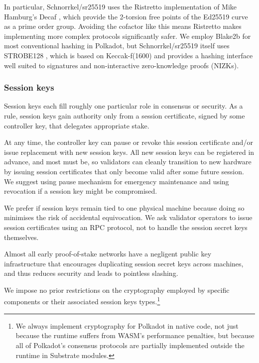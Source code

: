 \documentclass{article}
\begin{document}
In particular, Schnorrkel/sr25519 uses the Ristretto implementation \cite{Ristretto} of Mike Hamburg's Decaf \cite[\S7]{Decaf}, which provide the 2-torsion free points of the Ed25519 curve as a prime order group.  Avoiding the cofactor like this means Ristretto makes implementing more complex protocols significantly safer.  We employ Blake2b for most conventional hashing in Polkadot, but Schnorrkel/sr25519 itself uses STROBE128 \cite{STROBE}, which is based on Keccak-f(1600) and provides a hashing interface well suited to signatures and non-interactive zero-knowledge proofs (NIZKs).

\subsubsection{Session keys}\label{sec:session_keys}

Session keys each fill roughly one particular role in consensus or security.  As a rule, session keys gain authority only from a session certificate, signed by some controller key, that delegates appropriate stake.  

At any time, the controller key can pause or revoke this session certificate and/or issue replacement with new session keys.  All new session keys can be registered in advance, and most must be, so validators can cleanly transition to new hardware by issuing session certificates that only become valid after some future session.  We suggest using pause mechanism for emergency maintenance and using revocation if a session key might be compromised.  

We prefer if session keys remain tied to one physical machine because doing so minimises the risk of accidental equivocation.  We ask validator operators to issue session certificates using an RPC protocol, not to handle the session secret keys themselves.  

Almost all early proof-of-stake networks have a negligent public key infrastructure that encourages duplicating session secret keys across machines, and thus reduces security and leads to pointless slashing.

\smallskip

We impose no prior restrictions on the cryptography employed by specific components or their associated session keys types.\footnote{We always implement cryptography for Polkadot in native code, not just because the runtime suffers from WASM's performance penalties, but because all of Polkadot's consensus protocols are partially implemented outside the runtime in Substrate modules.}
\end{document}
